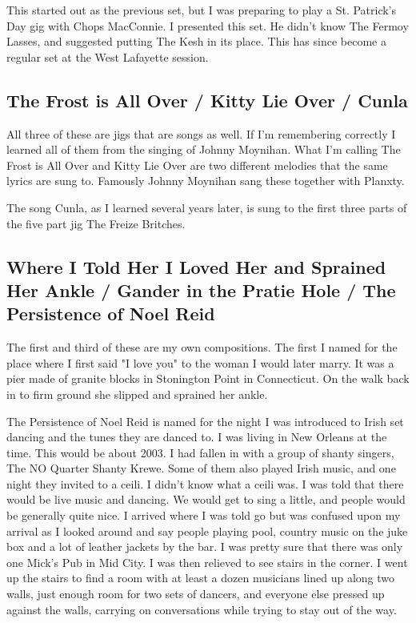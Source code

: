 \documentclass[11pt,letterpaper]{article}
\begin{document}
This started out as the previous set, but I was preparing to play a St. Patrick's Day gig with Chops MacConnie. I presented this set. He didn't know The Fermoy Lasses, and suggested putting The Kesh in its place. This has since become a regular set at the West Lafayette session.

\subsection*{The Frost is All Over / Kitty Lie Over / Cunla}

All three of these are jigs that are songs as well. If I'm remembering correctly I learned all of them from the singing of Johnny Moynihan. What I'm calling The Frost is All Over and Kitty Lie Over are two different melodies that the same lyrics are sung to. Famously Johnny Moynihan sang these together with Planxty. 

The song Cunla, as I learned several years later, is sung to the first three parts of the five part jig The Freize Britches.

\subsection*{Where I Told Her I Loved Her and Sprained Her Ankle / Gander in the Pratie Hole / The Persistence of Noel Reid}

The first and third of these are my own compositions. The first I named for the place where I first said "I love you" to the woman I would later marry. It was a pier made of granite blocks in Stonington Point in Connecticut. On the walk back in to firm ground she slipped and sprained her ankle. 

The Persistence of Noel Reid is named for the night I was introduced to Irish set dancing and the tunes they are danced to. I was living in New Orleans at the time. This would be about 2003. I had fallen in with a group of shanty singers, The NO Quarter Shanty Krewe. Some of them also played Irish music, and one night they invited to a ceili. I didn't know what a ceili was. I was told that there would be live music and dancing. We would get to sing a little, and people would be generally quite nice. 
I arrived where I was told go but was confused upon my arrival as I looked around and say people playing pool, country music on the juke box and a lot of leather jackets by the bar. I was pretty sure that there was only one Mick's Pub in Mid City. I was then relieved to see stairs in the corner. I went up the stairs to find a room with at least a dozen musicians lined up along two walls, just enough room for two sets of dancers, and everyone else pressed up against the walls, carrying on conversations while trying to stay out of the way. 
\end{document}
